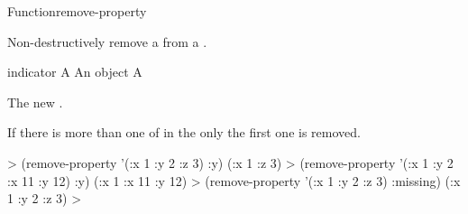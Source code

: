 \documentclass[10pt,twoside,english,pdftex]{article}
\begin{document}

\begin{functiondoc}{Function}{remove-property}{ 
    }
%
%
  
\fnsyntax

\fnpurpose Non-destructively remove a  from a
. 

\fnpackage {}

\fnmodule {}

\fnargs
\begin{args}{indicator}
\arg[plist] A 
\arg[indicator] An object
 A 
\end{args}

\fnreturns The new . 

\fndescription If there is more than one  of
 in the  only the first one is
removed.

\fnexamples
%
\W\supp
\begin{example}
  > (remove-property '(:x 1 :y 2 :z 3) :y)
  (:x 1 :z 3)
  > (remove-property '(:x 1 :y 2 :x 11 :y 12) :y)
  (:x 1 :x 11 :y 12)
  > (remove-property '(:x 1 :y 2 :z 3) :missing)
  (:x 1 :y 2 :z 3)
  >
\end{example}

\end{functiondoc}

\end{document}
